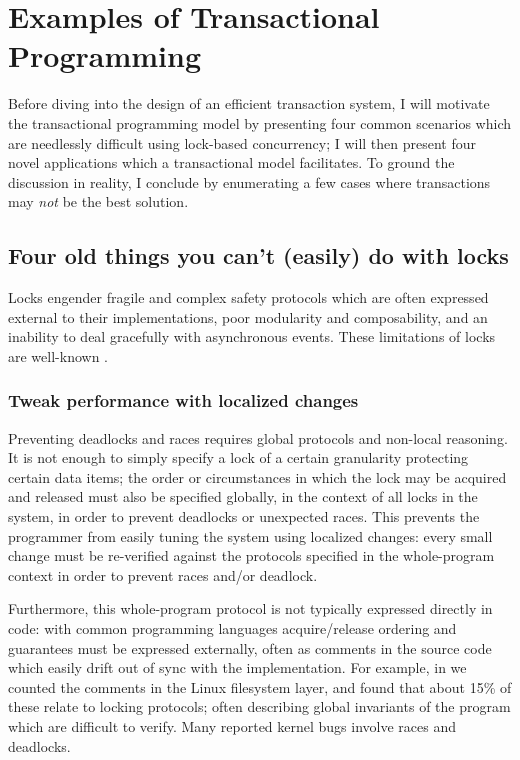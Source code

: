 \chapter{Examples of Transactional Programming}

Before diving into the design of an efficient transaction system,
I will motivate the transactional programming model by
presenting four common scenarios which are needlessly
difficult using lock-based concurrency; I will then present four novel
applications which a transactional model facilitates.  To ground the
discussion in reality, I conclude by enumerating a few cases where
transactions may \emph{not} be the best solution.

\section{Four old things you can't (easily) do with locks}
Locks engender fragile and complex safety protocols which
are often expressed external to their implementations, poor modularity
and composability, and an inability to deal gracefully with
asynchronous events.  These limitations of locks are well-known
\cite{Herlihy05}.

\subsection{Tweak performance with localized changes}
Preventing deadlocks and races requires global protocols and non-local
reasoning.  It is not enough to simply specify a lock of a certain
granularity protecting certain data items; the order or circumstances
in which the lock may be acquired and released must also be specified
globally, in the context of all locks in the system, in order to
prevent deadlocks or unexpected races.  This prevents the programmer
from easily tuning the system using localized changes: every small
change must be re-verified against the protocols specified in the
whole-program context in order to prevent races and/or deadlock.

Furthermore, this whole-program protocol is not typically expressed
directly in code: with common programming languages acquire/release
ordering and guarantees must be expressed externally, often as
comments in the source code which easily drift out of sync with the
implementation.  For example, in \cite{AnanianAsKuLeLi04} we counted
the comments in the Linux filesystem layer, and found that about 15\%
of these relate to locking protocols; often describing global
invariants of the program which are difficult to verify.  Many
reported kernel bugs involve races and deadlocks.

